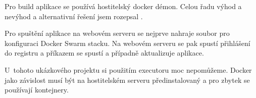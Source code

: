             Pro build aplikace se používá hostitelský docker démon. Celou řadu výhod a nevýhod a alternativní řešení jsem rozepsal .

            Pro spuštění aplikace na webovém serveru se nejprve nahraje soubor pro konfiguraci Docker Swarm stacku. Na webovém serveru se pak spustí přihlášení do registru a příkazem  se spustí a případně aktualizuje aplikace.

            U~tohoto ukázkového projektu si použitím  executoru moc nepomůžeme. Docker jako závislost musí být na hostitelském serveru předinstalovaný a pro zbytek se používají kontejnery.
